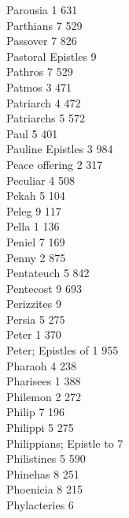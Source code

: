 Parousia \hfill 1 \quad \phantom{0}631\\
Parthians \hfill 7 \quad \phantom{0}529\\
Passover \hfill 7 \quad \phantom{0}826\\
Pastoral Epistles \hfill 9 \\
Pathros \hfill 7 \quad \phantom{0}529\\
Patmos \hfill 3 \quad \phantom{0}471\\
Patriarch \hfill 4 \quad \phantom{0}472\\
Patriarchs \hfill 5 \quad \phantom{0}572\\
Paul \hfill 5 \quad \phantom{0}401\\
Pauline Epistles \hfill 3 \quad \phantom{0}984\\
Peace offering \hfill 2 \quad \phantom{0}317\\
Peculiar \hfill 4 \quad \phantom{0}508\\
Pekah \hfill 5 \quad \phantom{0}104\\
Peleg \hfill 9 \quad \phantom{0}117\\
Pella \hfill 1 \quad \phantom{0}136\\
Peniel \hfill 7 \quad \phantom{0}169\\
Penny \hfill 2 \quad \phantom{0}875\\
Pentateuch \hfill 5 \quad \phantom{0}842\\
Pentecost \hfill 9 \quad \phantom{0}693\\
Perizzites \hfill 9 \\
Persia \hfill 5 \quad \phantom{0}275\\
Peter \hfill 1 \quad \phantom{0}370\\
Peter; Epistles of \hfill 1 \quad \phantom{0}955\\
Pharaoh \hfill 4 \quad \phantom{0}238\\
Pharisees \hfill 1 \quad \phantom{0}388\\
Philemon \hfill 2 \quad \phantom{0}272\\
Philip \hfill 7 \quad \phantom{0}196\\
Philippi \hfill 5 \quad \phantom{0}275\\
Philippians; Epistle to \hfill 7 \\
Philistines \hfill 5 \quad \phantom{0}590\\
Phinehas \hfill 8 \quad \phantom{0}251\\
Phoenicia \hfill 8 \quad \phantom{0}215\\
Phylacteries \hfill 6 \\
